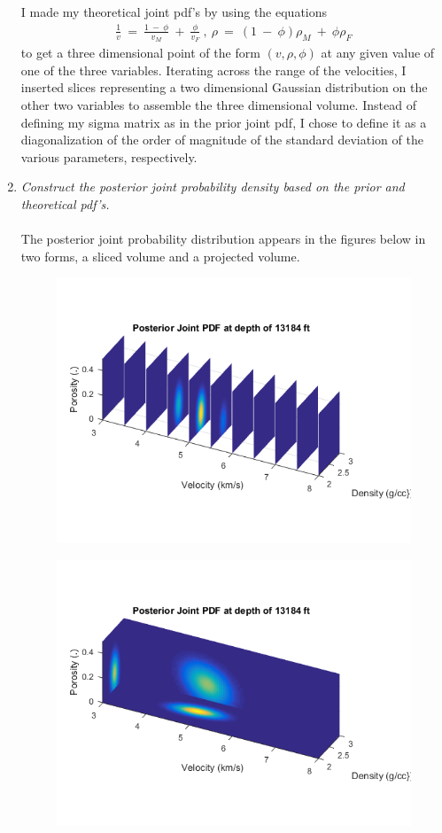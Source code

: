 \documentclass[12pt,runningheads]{article}
\begin{document}
\begin{enumerate}
\begin{figure}[!h]
\end{figure}
I made my theoretical joint pdf's by using the equations
\begin{align*}
\frac{1}{v}\ =\ \frac{1\ -\ \phi}{v_{M}}\ +\ \frac{\phi}{v_{F}}\ ,\ \rho\ =\ (1\ -\ \phi)\rho_{M}\ +\ \phi\rho_{F}
\end{align*}
to get a three dimensional point of the form $(v,\rho,\phi)$ at any given value of one of the three variables. Iterating across the range of the velocities, I inserted slices representing a two dimensional Gaussian distribution on the other two variables to assemble the three dimensional volume. Instead of defining my sigma matrix as in the prior joint pdf, I chose to define it as a diagonalization of the order of magnitude of the standard deviation of the various parameters, respectively.
\pagebreak
\item \textit{Construct the posterior joint probability density based on the prior and theoretical pdf's.}\\ \\
The posterior joint probability distribution appears in the figures below in two forms, a sliced volume and a projected volume.
\begin{figure}[!h]
\includegraphics[width=\textwidth]{PostS.png}
\end{figure}
\begin{figure}[!h]
\includegraphics[width=\textwidth]{PostP.png}

\end{figure}
\end{enumerate}
\end{document}
